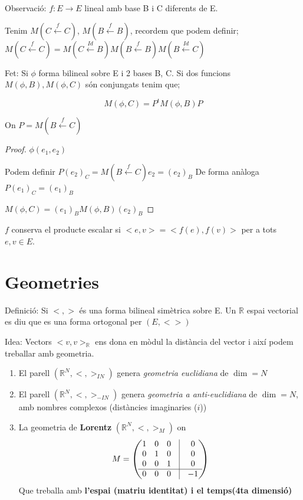 \documentclass[12pt]{article}
\newcommand{\R}{\mathbb{R}}
\begin{document}
\noindent Observació: $f: E\rightarrow E$ lineal amb base B i C diferents de E.

Tenim $M(C\xleftarrow{f}C)$, $M(B\xleftarrow{f}B)$, recordem que podem definir; $M(C\xleftarrow{f}C) = M(C\xleftarrow{Id}B)M(B\xleftarrow{f}B)M(B\xleftarrow{Id}C)$

\noindent Fet: Si $\phi$ forma bilineal sobre E i 2 bases B, C. Si dos funcions $M(\phi, B), M(\phi, C)$ són conjungats tenim que;

\[M(\phi, C) = P^t M(\phi, B)P\]

On $P = M(B \xleftarrow{f} C)$

\begin{proof}
    $\phi(e_1,e_2)$

    Podem definir $P(e_2)_C = M(B \xleftarrow{f}C)e_2 = (e_2)_B$
    De forma anàloga $P(e_1)_C = (e_1)_B$

    $M(\phi, C) = (e_1)_B M(\phi, B)(e_2)_B$
\end{proof}

$f$ conserva el producte escalar si $<e,v> = <f(e),f(v)>$ per a tots $e,v\in E$.

\section{Geometries}

\noindent Definició: Si $<,>$ és una forma bilineal simètrica sobre E. Un $\R$ espai vectorial es diu que es una forma ortogonal per $(E, <>)$

\noindent Idea: Vectors $< v,v>_\R$ ens dona en mòdul la distància del vector i així podem treballar amb geometria.

\begin{enumerate}
    \item El parell $(\R^N, <,>_{IN})$ genera \textit{geometria euclidiana} de $\dim = N$
    \item El parell $(\R^N, <,>_{-IN})$ genera \textit{geometria a anti-euclidiana} de $\dim = N$, amb nombres complexos (distàncies imaginaries ($i$))
    \item La geometria de \textbf{Lorentz} $(\R^N, <,>_M)$ on
    \[
        M = \begin{pmatrix}
        1 & 0 & 0 & \vline& 0\\
        0 & 1 & 0 & \vline&0\\
        0 & 0 & 1 & \vline&0\\
        \hline
        0 & 0 & 0 & \vline&-1\\
        \end{pmatrix}
    \]
    Que treballa amb \textbf{l'espai (matriu identitat) i el temps(4ta dimensió)}
\end{enumerate}
\end{document}
